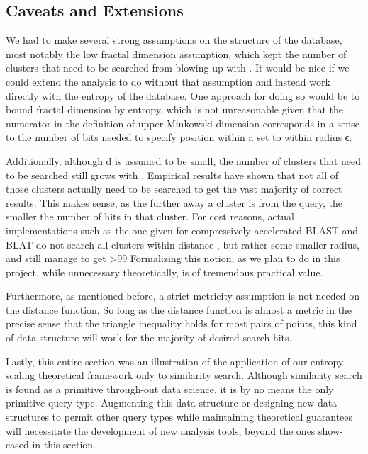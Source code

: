 \documentclass[review,preprint,12pt]{elsarticle}
\theoremstyle{definition}
\theoremstyle{remark}
\numberwithin{equation}{section}
\begin{document}
\subsection{Caveats and Extensions}

We had to make several strong assumptions on the structure of the database, most notably the low fractal dimension assumption, which kept the number of clusters that need to be searched from blowing up with .
It would be nice if we could extend the analysis to do without that assumption and instead work directly with the entropy of the database.
One approach for doing so would be to bound fractal dimension by entropy, which is not unreasonable given that the numerator in the definition of upper Minkowski dimension corresponds in a sense to the number of bits needed to specify position within a set to within radius ϵ.

Additionally, although d is assumed to be small, the number of clusters that need to be searched still grows with .
Empirical results have shown that not all of those clusters actually need to be searched to get the vast majority of correct results.
This makes sense, as the further away a cluster is from the query, the smaller the number of hits in that cluster.
For cost reasons, actual implementations such as the one given for compressively accelerated BLAST and BLAT do not search all clusters within distance , but rather some smaller radius, and still manage to get >99%
Formalizing this notion, as we plan to do in this project, while unnecessary theoretically, is of tremendous practical value.

Furthermore, as mentioned before, a strict metricity assumption is not needed on the distance function.
So long as the distance function is almost a metric in the precise sense that the triangle inequality holds for most pairs of points, this kind of data structure will work for the majority of desired search hits.

Lastly, this entire section was an illustration of the application of our entropy-scaling theoretical framework only to similarity search.
Although similarity search is found as a primitive through-out data science, it is by no means the only primitive query type.
Augmenting this data structure or designing new data structures to permit other query types while maintaining theoretical guarantees will necessitate the development of new analysis tools, beyond the ones show-cased in this section.
\end{document}
